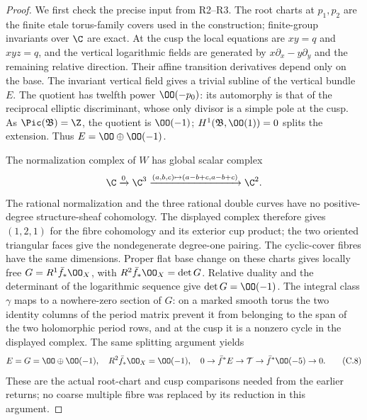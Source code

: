\begin{proof}
We first check the precise input from R2--R3. The root charts at $p_1,p_2$ are the finite etale torus-family covers used in the construction; finite-group invariants over $\C$ are exact. At the cusp the local equations are $xy=q$ and $xyz=q$, and the vertical logarithmic fields are generated by $x\partial_x-y\partial_y$ and the remaining relative direction. Their affine transition derivatives depend only on the base. The invariant vertical field gives a trivial subline of the vertical bundle $E$. The quotient has twelfth power $\OO(-p_0)$: its automorphy is that of the reciprocal elliptic discriminant, whose only divisor is a simple pole at the cusp. As $\Pic(\mathfrak B)=\Z$, the quotient is $\OO(-1)$; $H^1(\mathfrak B,\OO(1))=0$ splits the extension. Thus $E=\OO\oplus\OO(-1)$.

The normalization complex of $W$ has global scalar complex
\[
 \C\xrightarrow{0}\C^3
 \xrightarrow{(a,b,c)\mapsto(a-b+c,a-b+c)}\C^2.
\]
The rational normalization and the three rational double curves have no positive-degree structure-sheaf cohomology. The displayed complex therefore gives $(1,2,1)$ for the fibre cohomology and its exterior cup product; the two oriented triangular faces give the nondegenerate degree-one pairing. The cyclic-cover fibres have the same dimensions. Proper flat base change on these charts gives locally free $G=R^1\bar f_*\OO_X$, with $R^2\bar f_*\OO_X=\det G$. Relative duality and the determinant of the logarithmic sequence give $\det G=\OO(-1)$. The integral class $\gamma$ maps to a nowhere-zero section of $G$: on a marked smooth torus the two identity columns of the period matrix prevent it from belonging to the span of the two holomorphic period rows, and at the cusp it is a nonzero cycle in the displayed complex. The same splitting argument yields
\[
E=G=\OO\oplus\OO(-1),\quad R^2\bar f_*\OO_X=\OO(-1),
\quad0\to\bar f^*E\to\mathcal T\to\bar f^*\OO(-5)\to0. \tag{C.8}
\]
These are the actual root-chart and cusp comparisons needed from the earlier returns; no coarse multiple fibre was replaced by its reduction in this argument.


\end{proof}
